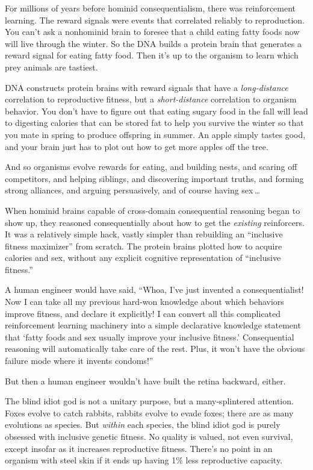 {{
 For millions of years before hominid consequentialism, there was
reinforcement learning. The reward signals were events that correlated
reliably to reproduction. You can't ask a nonhominid
brain to foresee that a child eating fatty foods now will live through
the winter. So the DNA builds a protein brain that generates a reward
signal for eating fatty food. Then it's up to the
organism to learn which prey animals are tastiest.}

{
 DNA constructs protein brains with reward signals that have a
\textit{long-distance} correlation to reproductive fitness, but a
\textit{short-distance} correlation to organism behavior. You
don't have to figure out that eating sugary food in the
fall will lead to digesting calories that can be stored fat to help you
survive the winter so that you mate in spring to produce offspring in
summer. An apple simply tastes good, and your brain just has to plot
out how to get more apples off the tree.}

{
 And so organisms evolve rewards for eating, and building nests,
and scaring off competitors, and helping siblings, and discovering
important truths, and forming strong alliances, and arguing
persuasively, and of course having sex\,\ldots}

{
 When hominid brains capable of cross-domain consequential
reasoning began to show up, they reasoned consequentially about how to
get the \textit{existing} reinforcers. It was a relatively simple hack,
vastly simpler than rebuilding an ``inclusive fitness
maximizer'' from scratch. The protein brains plotted
how to acquire calories and sex, without any explicit cognitive
representation of ``inclusive
fitness.''}

{
 A human engineer would have said, ``Whoa,
I've just invented a consequentialist! Now I can take
all my previous hard-won knowledge about which behaviors improve
fitness, and declare it explicitly! I can convert all this complicated
reinforcement learning machinery into a simple declarative knowledge
statement that `fatty foods and sex usually improve your
inclusive fitness.' Consequential reasoning will
automatically take care of the rest. Plus, it won't
have the obvious failure mode where it invents
condoms!''}

{
 But then a human engineer wouldn't have built the
retina backward, either.}

{
 The blind idiot god is not a unitary purpose, but a
many-splintered attention. Foxes evolve to catch rabbits, rabbits
evolve to evade foxes; there are as many evolutions as species. But
\textit{within} each species, the blind idiot god is purely obsessed
with inclusive genetic fitness. No quality is valued, not even
survival, except insofar as it increases reproductive fitness.
There's no point in an organism with steel skin if it
ends up having 1\% less reproductive capacity.}

}
